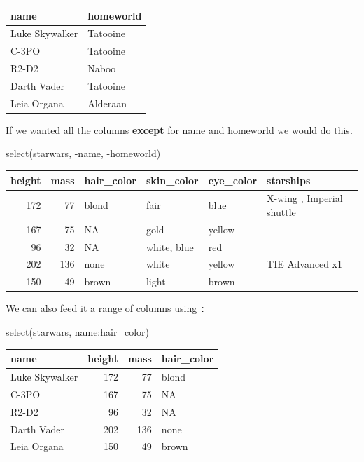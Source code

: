 \documentclass[
  letterpaper,
  DIV=11,
  numbers=noendperiod,
  oneside]{scrreprt}
\newenvironment{Shaded}{\begin{snugshade}}{\end{snugshade}}
\newcommand{\FunctionTok}[1]{\textcolor[rgb]{0.28,0.35,0.67}{#1}}
\newcommand{\NormalTok}[1]{\textcolor[rgb]{0.00,0.23,0.31}{#1}}
\newcommand{\SpecialCharTok}[1]{\textcolor[rgb]{0.37,0.37,0.37}{#1}}
\begin{document}
\begin{tabular}{l|l}
\hline
name & homeworld\\
\hline
Luke Skywalker & Tatooine\\
\hline
C-3PO & Tatooine\\
\hline
R2-D2 & Naboo\\
\hline
Darth Vader & Tatooine\\
\hline
Leia Organa & Alderaan\\
\hline
\end{tabular}

If we wanted all the columns \textbf{except} for name and homeworld we
would do this.

\begin{Shaded}
\begin{Highlighting}[]
\FunctionTok{select}\NormalTok{(starwars, }\SpecialCharTok{{-}}\NormalTok{name, }\SpecialCharTok{{-}}\NormalTok{homeworld)}
\end{Highlighting}
\end{Shaded}

\begin{tabular}{r|r|l|l|l|l}
\hline
height & mass & hair\_color & skin\_color & eye\_color & starships\\
\hline
172 & 77 & blond & fair & blue & X-wing          , Imperial shuttle\\
\hline
167 & 75 & NA & gold & yellow & \\
\hline
96 & 32 & NA & white, blue & red & \\
\hline
202 & 136 & none & white & yellow & TIE Advanced x1\\
\hline
150 & 49 & brown & light & brown & \\
\hline
\end{tabular}

We can also feed it a range of columns using \texttt{:}

\begin{Shaded}
\begin{Highlighting}[]
\FunctionTok{select}\NormalTok{(starwars, name}\SpecialCharTok{:}\NormalTok{hair\_color)}
\end{Highlighting}
\end{Shaded}

\begin{tabular}{l|r|r|l}
\hline
name & height & mass & hair\_color\\
\hline
Luke Skywalker & 172 & 77 & blond\\
\hline
C-3PO & 167 & 75 & NA\\
\hline
R2-D2 & 96 & 32 & NA\\
\hline
Darth Vader & 202 & 136 & none\\
\hline
Leia Organa & 150 & 49 & brown\\
\hline
\end{tabular}
\end{document}
